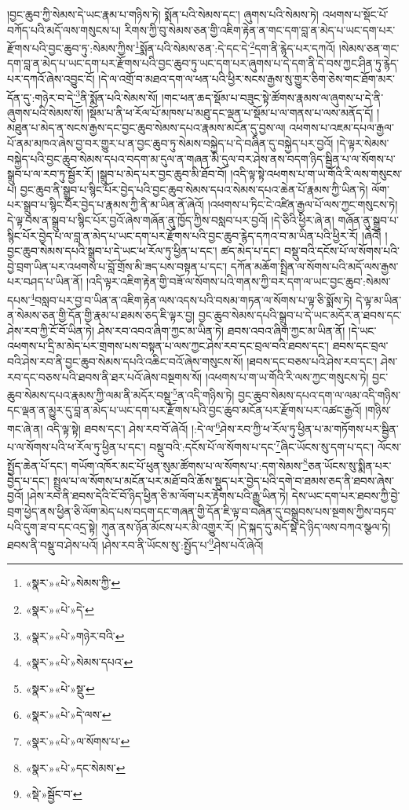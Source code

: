 །བྱང་ཆུབ་ཀྱི་སེམས་དེ་ཡང་རྣམ་པ་གཉིས་ཏེ། སྨོན་པའི་སེམས་དང་། ཞུགས་པའི་སེམས་ཏེ། འཕགས་པ་སྡོང་པོ་བཀོད་པའི་མདོ་ལས་གསུངས་པ། རིགས་ཀྱི་བུ་སེམས་ཅན་གྱི་འཇིག་རྟེན་ན་གང་དག་བླ་ན་མེད་པ་ཡང་དག་པར་རྫོགས་པའི་བྱང་ཆུབ་ཏུ་:སེམས་ཀྱིས་\footnote{«སྣར་»«པེ་»སེམས་ཀྱི་}སྨོན་པའི་སེམས་ཅན་:དེ་དང་དེ་\footnote{«སྣར་»«པེ་»དེ་}དག་ནི་རྙེད་པར་དཀའོ། །སེམས་ཅན་གང་དག་བླ་ན་མེད་པ་ཡང་དག་པར་རྫོགས་པའི་བྱང་ཆུབ་ཏུ་ཡང་དག་པར་ཞུགས་པ་དེ་དག་ནི་དེ་བས་ཀྱང་ཤིན་ཏུ་རྙེད་པར་དཀའོ་ཞེས་འབྱུང་ངོ། །དེ་ལ་འགྲོ་བ་མཐའ་དག་ལ་ཕན་པའི་ཕྱིར་སངས་རྒྱས་སུ་གྱུར་ཅིག་ཅེས་གང་ཐོག་མར་དོན་དུ་:གཉེར་བ་དེ་\footnote{«སྣར་»«པེ་»གཉེར་བའི་}ནི་སྨོན་པའི་སེམས་སོ། །གང་ཕན་ཆད་སྡོམ་པ་བཟུང་སྟེ་ཚོགས་རྣམས་ལ་ཞུགས་པ་དེ་ནི་ཞུགས་པའི་སེམས་སོ། །སྡོམ་པ་ནི་ཕ་རོལ་པོ་མཁས་པ་མཐུ་དང་ལྡན་པ་སྡོམ་པ་ལ་གནས་པ་ལས་མནོད་དོ། །མཐུན་པ་མེད་ན་སངས་རྒྱས་དང་བྱང་ཆུབ་སེམས་དཔའ་རྣམས་མངོན་དུ་བྱས་ལ། འཕགས་པ་འཇམ་དཔལ་རྒྱལ་པོ་ནམ་མཁའ་ཞེས་བྱ་བར་གྱུར་པ་ན་བྱང་ཆུབ་ཏུ་སེམས་བསྐྱེད་པ་དེ་བཞིན་དུ་བསྐྱེད་པར་བྱའོ། །དེ་ལྟར་སེམས་བསྐྱེད་པའི་བྱང་ཆུབ་སེམས་དཔའ་བདག་མ་དུལ་ན་གཞན་མི་དུལ་བར་ཤེས་ནས་བདག་ཉིད་སྦྱིན་པ་ལ་སོགས་པ་སྒྲུབ་པ་ལ་རབ་ཏུ་སྦྱོར་རོ། །སྒྲུབ་པ་མེད་པར་བྱང་ཆུབ་མི་ཐོབ་བོ། །འདི་ལྟ་སྟེ་འཕགས་པ་ག་ཡ་གོའི་རི་ལས་གསུངས་པ། བྱང་ཆུབ་ནི་སྒྲུབ་པ་སྙིང་པོར་བྱེད་པའི་བྱང་ཆུབ་སེམས་དཔའ་སེམས་དཔའ་ཆེན་པོ་རྣམས་ཀྱི་ཡིན་ཏེ། ལོག་པར་སྒྲུབ་པ་སྙིང་པོར་བྱེད་པ་རྣམས་ཀྱི་ནི་མ་ཡིན་ནོ་ཞེའོ། །འཕགས་པ་ཏིང་ངེ་འཛིན་རྒྱལ་པོ་ལས་ཀྱང་གསུངས་ཏེ། དེ་ལྟ་བས་ན་སྒྲུབ་པ་སྙིང་པོར་བྱའོ་ཞེས་གཞོན་ནུ་ཁྱོད་ཀྱིས་བསླབ་པར་བྱའོ། །དེ་ཅིའི་ཕྱིར་ཞེ་ན། གཞོན་ནུ་སྒྲུབ་པ་སྙིང་པོར་བྱེད་པ་ལ་བླ་ན་མེད་པ་ཡང་དག་པར་རྫོགས་པའི་བྱང་ཆུབ་རྙེད་དཀའ་བ་མ་ཡིན་པའི་ཕྱིར་རོ། །ཞེའོ། །བྱང་ཆུབ་སེམས་དཔའི་སྒྲུབ་པ་དེ་ཡང་ཕ་རོལ་ཏུ་ཕྱིན་པ་དང་། ཚད་མེད་པ་དང་། བསྡུ་བའི་དངོས་པོ་ལ་སོགས་པའི་བྱེ་བྲག་ཡིན་པར་འཕགས་པ་བློ་གྲོས་མི་ཟད་པས་བསྟན་པ་དང་། དཀོན་མཆོག་སྤྲིན་ལ་སོགས་པའི་མདོ་ལས་རྒྱས་པར་བཤད་པ་ཡིན་ནོ། །འདི་ལྟར་འཇིག་རྟེན་གྱི་བཟོ་ལ་སོགས་པའི་གནས་ཀྱི་བར་དག་ལ་ཡང་བྱང་ཆུབ་:སེམས་དཔས་\footnote{«སྣར་»«པེ་»སེམས་དཔའ་}བསླབ་པར་བྱ་བ་ཡིན་ན་འཇིག་རྟེན་ལས་འདས་པའི་བསམ་གཏན་ལ་སོགས་པ་ལྟ་ཅི་སྨོས་ཏེ། དེ་ལྟ་མ་ཡིན་ན་སེམས་ཅན་གྱི་དོན་གྱི་རྣམ་པ་ཐམས་ཅད་ཇི་ལྟར་བྱ། བྱང་ཆུབ་སེམས་དཔའི་སྒྲུབ་པ་དེ་ཡང་མདོར་ན་ཐབས་དང་ཤེས་རབ་ཀྱི་ངོ་བོ་ཡིན་ཏེ། ཤེས་རབ་འབའ་ཞིག་ཀྱང་མ་ཡིན་ཏེ། ཐབས་འབའ་ཞིག་ཀྱང་མ་ཡིན་ནོ། །དེ་ཡང་འཕགས་པ་དྲི་མ་མེད་པར་གྲགས་པས་བསྟན་པ་ལས་ཀྱང་ཤེས་རབ་དང་བྲལ་བའི་ཐབས་དང་། ཐབས་དང་བྲལ་བའི་ཤེས་རབ་ནི་བྱང་ཆུབ་སེམས་དཔའི་འཆིང་བའོ་ཞེས་གསུངས་སོ། །ཐབས་དང་བཅས་པའི་ཤེས་རབ་དང་། ཤེས་རབ་དང་བཅས་པའི་ཐབས་ནི་ཐར་པའོ་ཞེས་བསྔགས་སོ། །འཕགས་པ་ག་ཡ་གོའི་རི་ལས་ཀྱང་གསུངས་ཏེ། བྱང་ཆུབ་སེམས་དཔའ་རྣམས་ཀྱི་ལམ་ནི་མདོར་བསྡུ་\footnote{«སྣར་»«པེ་»སྡུ་}ན་འདི་གཉིས་ཏེ། བྱང་ཆུབ་སེམས་དཔའ་དག་ལ་ལམ་འདི་གཉིས་དང་ལྡན་ན་མྱུར་དུ་བླ་ན་མེད་པ་ཡང་དག་པར་རྫོགས་པའི་བྱང་ཆུབ་མངོན་པར་རྫོགས་པར་འཚང་རྒྱའོ། །གཉིས་གང་ཞེ་ན། འདི་ལྟ་སྟེ། ཐབས་དང་། ཤེས་རབ་བོ་ཞེའོ། །:དེ་ལ་\footnote{«སྣར་»«པེ་»དེ་ལས་}ཤེས་རབ་ཀྱི་ཕ་རོལ་ཏུ་ཕྱིན་པ་མ་གཏོགས་པར་སྦྱིན་པ་ལ་སོགས་པའི་ཕ་རོལ་ཏུ་ཕྱིན་པ་དང་། བསྡུ་བའི་:དངོས་པོ་ལ་སོགས་པ་དང་\footnote{«སྣར་»«པེ་»ལ་སོགས་པ་}ཞིང་ཡོངས་སུ་དག་པ་དང་། ལོངས་སྤྱོད་ཆེན་པོ་དང་། གཡོག་འཁོར་མང་པོ་ཕུན་སུམ་ཚོགས་པ་ལ་སོགས་པ་:དག་སེམས་\footnote{«སྣར་»«པེ་»དང་སེམས་}ཅན་ཡོངས་སུ་སྨིན་པར་བྱེད་པ་དང་། སྤྲུལ་པ་ལ་སོགས་པ་མངོན་པར་མཐོ་བའི་ཆོས་སྡུད་པར་བྱེད་པའི་དགེ་བ་ཐམས་ཅད་ནི་ཐབས་ཞེས་བྱའོ། །ཤེས་རབ་ནི་ཐབས་དེའི་ངོ་བོ་ཉིད་ཕྱིན་ཅི་མ་ལོག་པར་རྟོགས་པའི་རྒྱུ་ཡིན་ཏེ། དེས་ཡང་དག་པར་ཐབས་ཀྱི་བྱེ་བྲག་ཕྱེད་ནས་ཕྱིན་ཅི་ལོག་མེད་པས་བདག་དང་གཞན་གྱི་དོན་ཇི་ལྟ་བ་བཞིན་དུ་བསྒྲུབས་པས་སྔགས་ཀྱིས་བཏབ་པའི་དུག་ཟ་བ་དང་འདྲ་སྟེ། ཀུན་ནས་ཉོན་མོངས་པར་མི་འགྱུར་རོ། །དེ་སྐད་དུ་མདོ་སྡེ་དེ་ཉིད་ལས་བཀའ་སྩལ་ཏེ། ཐབས་ནི་བསྡུ་བ་ཤེས་པའོ། །ཤེས་རབ་ནི་ཡོངས་སུ་:སྤྱོད་པ་\footnote{«སྡེ་»སྦྱོང་བ་}ཤེས་པའོ་ཞེའོ། 